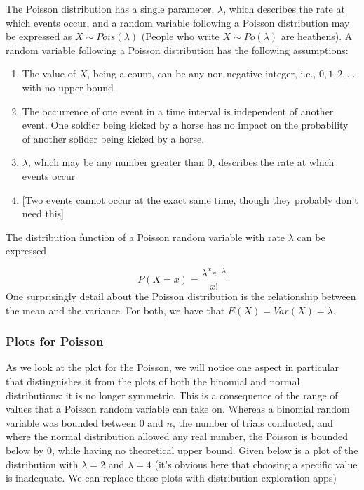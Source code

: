 \documentclass[
]{book}
\providecommand{\tightlist}{%
  \setlength{\itemsep}{0pt}\setlength{\parskip}{0pt}}
\theoremstyle{definition}
\theoremstyle{definition}
\theoremstyle{definition}
\theoremstyle{remark}
\begin{document}
The Poisson distribution has a single parameter, \(\lambda\), which describes the rate at which events occur, and a random variable following a Poisson distribution may be expressed as \(X \sim Pois(\lambda)\) (People who write \(X \sim Po(\lambda)\) are heathens). A random variable following a Poisson distribution has the following assumptions:

\begin{enumerate}
\def\labelenumi{\arabic{enumi}.}
\tightlist
\item
  The value of \(X\), being a count, can be any non-negative integer, i.e., \(0, 1, 2, \dots\) with no upper bound
\item
  The occurrence of one event in a time interval is independent of another event. One soldier being kicked by a horse has no impact on the probability of another solider being kicked by a horse.
\item
  \(\lambda\), which may be any number greater than \(0\), describes the rate at which events occur
\item
  {[}Two events cannot occur at the exact same time, though they probably don't need this{]}
\end{enumerate}

The distribution function of a Poisson random variable with rate \(\lambda\) can be expressed

\[
P(X = x) = \frac{\lambda^x e^{-\lambda}}{x!}
\]
One surprisingly detail about the Poisson distribution is the relationship between the mean and the variance. For both, we have that \(E(X) = Var(X) = \lambda\).

\hypertarget{plots-for-poisson}{%
\subsubsection{Plots for Poisson}\label{plots-for-poisson}}

As we look at the plot for the Poisson, we will notice one aspect in particular that distinguishes it from the plots of both the binomial and normal distributions: it is no longer symmetric. This is a consequence of the range of values that a Poisson random variable can take on. Whereas a binomial random variable was bounded between \(0\) and \(n\), the number of trials conducted, and where the normal distribution allowed any real number, the Poisson is bounded below by \(0\), while having no theoretical upper bound. Given below is a plot of the distribution with \(\lambda = 2\) and \(\lambda = 4\) (it's obvious here that choosing a specific value is inadequate. We can replace these plots with distribution exploration apps)
\end{document}
